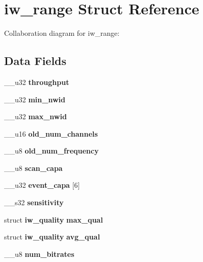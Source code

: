 \section{iw\-\_\-range \-Struct \-Reference}
\label{structiw__range}


\-Collaboration diagram for iw\-\_\-range\-:
\subsection*{\-Data \-Fields}
\begin{DoxyCompactItemize}
\item 
\-\_\-\-\_\-u32 {\bfseries throughput}\label{structiw__range_a150f8ac5caa8f3be4c974a12c98b4344}

\item 
\-\_\-\-\_\-u32 {\bfseries min\-\_\-nwid}\label{structiw__range_ab7b33658a59eb13d96b40b488c3408f9}

\item 
\-\_\-\-\_\-u32 {\bfseries max\-\_\-nwid}\label{structiw__range_a5357dda59d5d56c413d9d82b66702320}

\item 
\-\_\-\-\_\-u16 {\bfseries old\-\_\-num\-\_\-channels}\label{structiw__range_a853f8d96cff8676d6ec7ee123a8987a8}

\item 
\-\_\-\-\_\-u8 {\bfseries old\-\_\-num\-\_\-frequency}\label{structiw__range_a35f98a1112d57f60c89fce9764d2ac80}

\item 
\-\_\-\-\_\-u8 {\bfseries scan\-\_\-capa}\label{structiw__range_a98a7f7141a79cf035f89ba8459f7b33e}

\item 
\-\_\-\-\_\-u32 {\bfseries event\-\_\-capa} [6]\label{structiw__range_a7d481f34e20a2455ae7f9898f8b30301}

\item 
\-\_\-\-\_\-s32 {\bfseries sensitivity}\label{structiw__range_a2bd6f61a7eb36ea363c8a141815e51ba}

\item 
struct {\bf iw\-\_\-quality} {\bfseries max\-\_\-qual}\label{structiw__range_a8e89d574917e2709bd243cdcc8f16986}

\item 
struct {\bf iw\-\_\-quality} {\bfseries avg\-\_\-qual}\label{structiw__range_a0bf5ab167d2b0653f6e653ffb707e5ae}

\item 
\-\_\-\-\_\-u8 {\bfseries num\-\_\-bitrates}\label{structiw__range_a425661aff751a264e221ef0426dbc1b5}


\end{DoxyCompactItemize}
